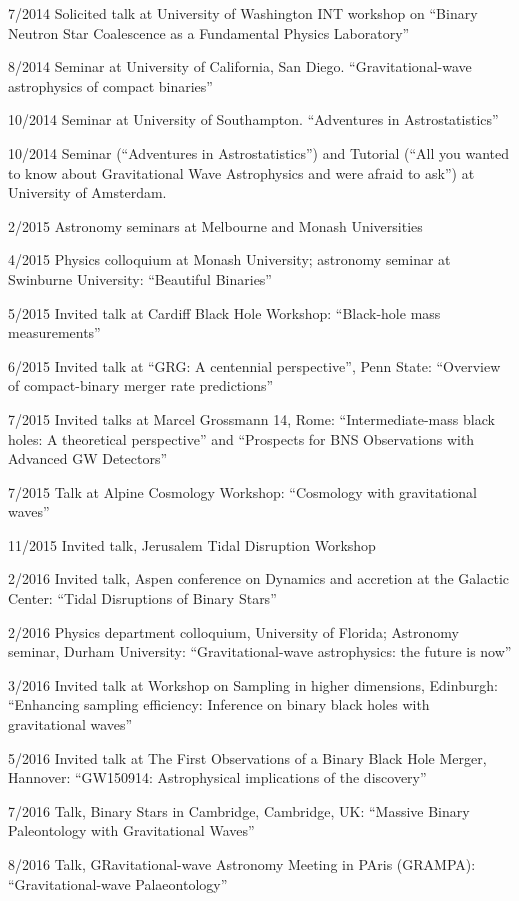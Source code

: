 \documentclass[margin,line]{res}
\begin{document}
\begin{resume}
7/2014	Solicited talk at University of Washington INT workshop on ``Binary Neutron Star Coalescence as a Fundamental Physics Laboratory''

8/2014 	Seminar at University of California, San Diego.   ``Gravitational-wave astrophysics of compact binaries''

10/2014	Seminar at University of Southampton.  ``Adventures in Astrostatistics''

10/2014	Seminar (``Adventures in Astrostatistics'') and Tutorial (``All you wanted to know about Gravitational Wave Astrophysics and were afraid to ask'') at University of Amsterdam.  

2/2015	Astronomy seminars at Melbourne and Monash Universities

4/2015 	Physics colloquium at Monash University; astronomy seminar at Swinburne University:  ``Beautiful Binaries''

5/2015	Invited talk at Cardiff Black Hole Workshop: ``Black-hole mass measurements''

6/2015	Invited talk at ``GRG: A centennial perspective'', Penn State: ``Overview of compact-binary merger rate predictions''

7/2015	Invited talks at Marcel Grossmann 14, Rome: ``Intermediate-mass black holes: A theoretical perspective'' and ``Prospects for BNS Observations with Advanced GW Detectors''

7/2015	Talk at Alpine Cosmology Workshop: ``Cosmology with gravitational waves''

11/2015	Invited talk, Jerusalem Tidal Disruption Workshop

2/2016 	Invited talk, Aspen conference on Dynamics and accretion at the Galactic Center: ``Tidal Disruptions of Binary Stars''

2/2016	Physics department colloquium, University of Florida;  Astronomy seminar, Durham University: ``Gravitational-wave astrophysics: the future is now''

3/2016	Invited talk at Workshop on Sampling in higher dimensions, Edinburgh: ``Enhancing sampling efficiency: Inference on binary black holes with gravitational waves''

5/2016 	Invited talk at The First Observations of a Binary Black Hole Merger, Hannover: ``GW150914: Astrophysical implications of the discovery''

7/2016	Talk, Binary Stars in Cambridge, Cambridge, UK: ``Massive Binary Paleontology with Gravitational Waves''

8/2016 	Talk, GRavitational-wave Astronomy Meeting in PAris (GRAMPA): ``Gravitational-wave Palaeontology''


\end{resume}
\end{document}
